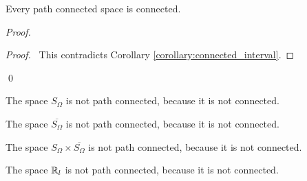 \begin{proposition}
    \label{proposition:connected_path_connected}
    Every path connected space is connected.
\end{proposition}

\begin{proof}
    \pf
    \qedstep
    \begin{proof}
        \pf\ This contradicts Corollary \ref{corollary:connected_interval}.
    \end{proof}
    \qed
\end{proof}

\begin{example}
    The space $S_\Omega$ is not path connected, because it is not connected.
\end{example}

\begin{example}
    The space $\overline{S_\Omega}$ is not path connected, because it is not connected.
\end{example}

\begin{example}
    The space $S_\Omega \times \overline{S_\Omega}$ is not path connected, because it is not connected.
\end{example}

\begin{example}
    The space $\mathbb{R}_l$ is not path connected, because it is not connected.
\end{example}

